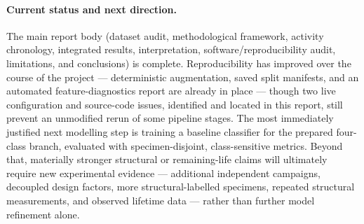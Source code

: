 \paragraph{Current status and next direction.} The main report body
(dataset audit, methodological framework, activity chronology, integrated
results, interpretation, software/reproducibility audit, limitations, and
conclusions) is complete. Reproducibility has improved over the course of
the project — deterministic augmentation, saved split manifests, and an
automated feature-diagnostics report are already in place — though two
live configuration and source-code issues, identified and located in this
report, still prevent an unmodified rerun of some pipeline stages. The
most immediately justified next modelling step is training a baseline
classifier for the prepared four-class branch, evaluated with
specimen-disjoint, class-sensitive metrics. Beyond that, materially
stronger structural or remaining-life claims will ultimately require new
experimental evidence — additional independent campaigns, decoupled
design factors, more structural-labelled specimens, repeated structural
measurements, and observed lifetime data — rather than further model
refinement alone.
